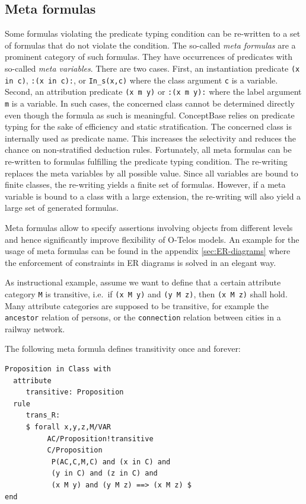 \subsection{Meta formulas}
\label{sec:CCmeta}

Some formulas violating the predicate typing condition can be re-written to a set
of formulas that do not violate the condition. The so-called {\em meta formulas\/} are
a prominent category of such formulas. They have occurrences of predicates
with so-called {\em meta variables}. There are two cases. First, an instantiation
predicate {\tt (x in c)}, {\tt :(x in c):}, or {\tt In\_s(x,c)} where the class
argument {\tt c} is a variable.
Second, an attribution predicate {\tt (x m y)} or {\tt :(x m y):} where the
label argument {\tt m} is a variable.
In such cases, the concerned class cannot be determined directly
even though the formula as such is meaningful. 
ConceptBase relies on predicate typing for the sake of efficiency and static stratification.
The concerned class is internally used as predicate name. This increases the selectivity
and reduces the chance on non-stratified deduction rules. Fortunately, all meta formulas
can be re-written to formulas fulfilling the predicate typing condition. The re-writing 
replaces the meta variables by all possible value. Since all variables are bound to finite classes,
the re-writing yields a finite set of formulas. However, if a meta variable is bound to
a class with a large extension, the re-writing will also yield a large set of generated
formulas.

Meta formulas allow to specify assertions
involving objects from different levels and hence
significantly improve flexibility of O-Telos models.
An example for the usage of meta formulas can be found
in the appendix \ref{sec:ER-diagrams} where
the enforcement of constraints in ER diagrams
is solved in an elegant way.

As instructional example, assume we want to define that a certain attribute category {\tt M}
is transitive, i.e.\ if {\tt (x M y)} and  {\tt (y M z)}, then {\tt (x M z)} shall hold.
Many attribute categories are supposed to be transitive, for example the {\tt ancestor}
relation of persons, or the {\tt connection} relation between cities in a railway network.

The following meta formula defines transitivity once and forever:

\begin{verbatim}
Proposition in Class with
  attribute
     transitive: Proposition
  rule
     trans_R: 
     $ forall x,y,z,M/VAR 
          AC/Proposition!transitive 
          C/Proposition
           P(AC,C,M,C) and (x in C) and 
           (y in C) and (z in C) and
           (x M y) and (y M z) ==> (x M z) $
end
\end{verbatim}

